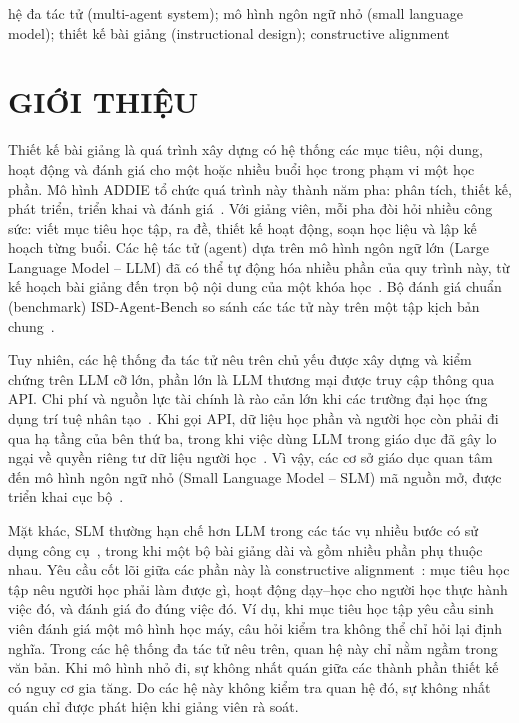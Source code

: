 \documentclass[conference,a4paper]{IEEEtran}
\begin{document}
\begin{IEEEkeywords}
hệ đa tác tử (multi-agent system); mô hình ngôn ngữ nhỏ (small language model);
thiết kế bài giảng (instructional design); constructive alignment
\end{IEEEkeywords}

\section{GIỚI THIỆU}
\label{sec:intro}

Thiết kế bài giảng là quá trình xây dựng có hệ thống các mục tiêu, nội dung, hoạt động và đánh giá
cho một hoặc nhiều buổi học trong phạm vi một học phần. Mô hình ADDIE tổ chức quá trình này thành năm
pha: phân tích, thiết kế, phát triển, triển khai và đánh giá~\cite{branch2009addie}. Với giảng
viên, mỗi pha đòi hỏi nhiều công sức: viết mục tiêu học tập, ra đề, thiết kế hoạt động, soạn học liệu và
lập kế hoạch từng buổi. Các hệ tác tử (agent) dựa trên mô hình ngôn ngữ lớn (Large Language Model --
LLM) đã có thể tự động hóa nhiều phần của quy trình này, từ kế hoạch bài giảng đến trọn bộ
nội dung của một khóa học~\cite{zeng2026coma,zhang2025eduplanner,yao2025instructionalagents}.
Bộ đánh giá chuẩn (benchmark) ISD-Agent-Bench so sánh các tác tử này trên một tập kịch bản
chung~\cite{isdagentbench}.

Tuy nhiên, các hệ thống đa tác tử nêu trên chủ yếu được xây dựng và kiểm chứng trên LLM cỡ lớn, phần
lớn là LLM thương mại được truy cập thông qua API. Chi phí và nguồn lực tài chính là rào cản lớn khi các trường đại học ứng dụng trí tuệ nhân
tạo~\cite{robert2025educause}. Khi gọi API, dữ liệu học phần và người học còn phải đi qua hạ tầng của bên
thứ ba, trong khi việc dùng LLM trong giáo dục đã gây lo ngại về quyền riêng tư dữ liệu
người học~\cite{yan2024ethical}. Vì vậy, các cơ sở giáo dục quan tâm đến mô
hình ngôn ngữ nhỏ (Small Language Model -- SLM) mã nguồn mở, được triển khai
cục bộ~\cite{chan2026bigger,katharakis2025slm}.

Mặt khác, SLM thường hạn chế hơn LLM trong các tác vụ nhiều bước có sử dụng công cụ~\cite{shen2024multillmagent},
trong khi một bộ bài giảng dài và gồm nhiều phần phụ thuộc nhau. Yêu cầu cốt lõi giữa
các phần này là constructive alignment~\cite{biggs1996enhancing}: mục tiêu học tập nêu người học
phải làm được gì, hoạt động dạy--học cho người học thực hành việc đó, và đánh giá đo đúng việc đó. Ví
dụ, khi mục tiêu học tập yêu cầu sinh viên đánh giá một mô hình học máy, câu hỏi kiểm tra không thể chỉ
hỏi lại định nghĩa. Trong các hệ thống đa tác tử nêu trên, quan hệ này chỉ nằm ngầm trong văn bản. Khi mô hình nhỏ đi,
sự không nhất quán giữa các thành phần thiết kế có nguy cơ gia tăng. Do các hệ này không kiểm tra
quan hệ đó, sự không nhất quán chỉ được phát hiện khi giảng viên rà soát.
\end{document}
